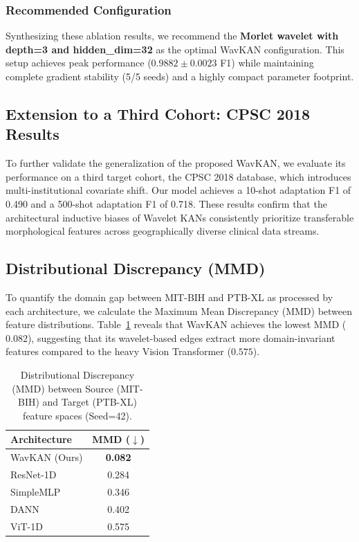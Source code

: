 \documentclass[journal,twoside,web]{ieeecolor}
\begin{document}
\subsubsection{Recommended Configuration}
Synthesizing these ablation results, we recommend the \textbf{Morlet wavelet with depth=3 and hidden\_dim=32} as the optimal WavKAN configuration. This setup achieves peak performance ($0.9882 \pm 0.0023$ F1) while maintaining complete gradient stability (5/5 seeds) and a highly compact parameter footprint.

\subsection{Extension to a Third Cohort: CPSC 2018 Results}

To further validate the generalization of the proposed WavKAN, we evaluate its performance on a third target cohort, the CPSC 2018 database, which introduces multi-institutional covariate shift. Our model achieves a 10-shot adaptation F1 of 0.490 and a 500-shot adaptation F1 of 0.718. These results confirm that the architectural inductive biases of Wavelet KANs consistently prioritize transferable morphological features across geographically diverse clinical data streams.

\subsection{Distributional Discrepancy (MMD)}

To quantify the domain gap between MIT-BIH and PTB-XL as processed by each architecture, we calculate the Maximum Mean Discrepancy (MMD) between feature distributions. Table~\ref{tab:mmd} reveals that WavKAN achieves the lowest MMD ($0.082$), suggesting that its wavelet-based edges extract more domain-invariant features compared to the heavy Vision Transformer ($0.575$).

\begin{table}[!t]
\centering
\caption{Distributional Discrepancy (MMD) between Source (MIT-BIH) and Target (PTB-XL) feature spaces (Seed=42).}
\label{tab:mmd}
\begin{tabular}{@{}lc@{}}
\toprule
\textbf{Architecture} & \textbf{MMD ($\downarrow$)} \\
\midrule
WavKAN (Ours)    & \textbf{0.082} \\
ResNet-1D        & 0.284 \\
SimpleMLP        & 0.346 \\
DANN             & 0.402 \\
ViT-1D           & 0.575 \\
\bottomrule
\end{tabular}
\end{table}
\end{document}
